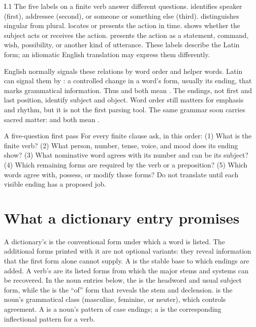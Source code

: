 \begin{courseunit}{I.1}
The five labels on a finite verb answer different questions. 
identifies speaker (first), addressee (second), or someone or something else
(third).  distinguishes singular from plural. 
locates or presents the action in time.  shows whether the subject
acts or receives the action.  presents the action as a statement,
command, wish, possibility, or another kind of utterance. These labels describe
the Latin form; an idiomatic English translation may express them differently.

English normally signals these relations by word order and helper words. Latin
can signal them by : a controlled change in a word's form,
usually its ending, that marks grammatical information. Thus  and  both mean . The endings, not first and last position, identify subject
and object. Word order still matters for emphasis and rhythm, but it is not the
first parsing tool. The same grammar soon carries sacred matter:
 and  both mean
.

\begin{grammarbox}{A five-question first pass}
For every finite clause ask, in this order: (1) What is the finite verb?
(2) What person, number, tense, voice, and mood does its ending show?
(3) What nominative word agrees with its number and can be its subject?
(4) Which remaining forms are required by the verb or a preposition?
(5) Which words agree with, possess, or modify those forms? Do not translate
until each visible ending has a proposed job.
\end{grammarbox}

\section{What a dictionary entry promises}

A dictionary's  is the conventional form under which a
word is listed. The additional forms printed with it are not optional variants:
they reveal information that the first form alone cannot supply. A 
is the stable base to which endings are added. A verb's 
are its listed forms from which the major stems and systems can be recovered.
In the noun entries below, the  is the headword and usual
subject form, while the  is the ``of'' form that reveals the
stem and declension.  is the noun's grammatical class (masculine,
feminine, or neuter), which controls agreement. A  is a noun's
pattern of case endings; a  is the corresponding inflectional
pattern for a verb.


\end{courseunit}

